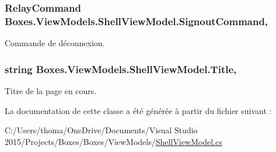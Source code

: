 \subsubsection[{\texorpdfstring{Signout\+Command}{SignoutCommand}}]{\setlength{\rightskip}{0pt plus 5cm}Relay\+Command Boxes.\+View\+Models.\+Shell\+View\+Model.\+Signout\+Command\hspace{0.3cm}{\ttfamily [get]}, {}}\hypertarget{class_boxes_1_1_view_models_1_1_shell_view_model_acd36737e5c5366baa05998f11294d25c}{}\label{class_boxes_1_1_view_models_1_1_shell_view_model_acd36737e5c5366baa05998f11294d25c}


Commande de déconnexion. 

\subsubsection[{\texorpdfstring{Title}{Title}}]{\setlength{\rightskip}{0pt plus 5cm}string Boxes.\+View\+Models.\+Shell\+View\+Model.\+Title\hspace{0.3cm}{\ttfamily [get]}, {\ttfamily [set]}}\hypertarget{class_boxes_1_1_view_models_1_1_shell_view_model_a1640979a1fef171c4923787cef2e551f}{}\label{class_boxes_1_1_view_models_1_1_shell_view_model_a1640979a1fef171c4923787cef2e551f}


Titre de la page en cours. 



La documentation de cette classe a été générée à partir du fichier suivant \+:\begin{DoxyCompactItemize}
\item 
C\+:/\+Users/thoma/\+One\+Drive/\+Documents/\+Visual Studio 2015/\+Projects/\+Boxes/\+Boxes/\+View\+Models/\hyperlink{_shell_view_model_8cs}{Shell\+View\+Model.\+cs}\end{DoxyCompactItemize}
